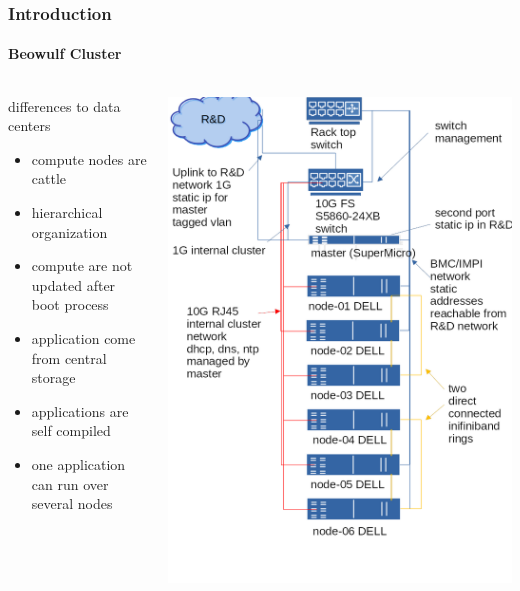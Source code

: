 \documentclass[aspectratio=169]{beamer}
\begin{document}
\begin{frame}[fragile]
\frametitle{Introduction}
\framesubtitle{Beowulf Cluster}
\begin{columns}
\begin{block}{differences to data centers}
  \begin{itemize}
    \item compute nodes are cattle
    \item hierarchical organization
    \item compute are not updated after boot process
    \item application come from central storage
    \item applications are self compiled
    \item one application can run over several nodes
  \end{itemize}
\end{block}
  \includegraphics[width=.6\linewidth]{networkplan}
\end{columns}
\end{frame}
\end{document}
